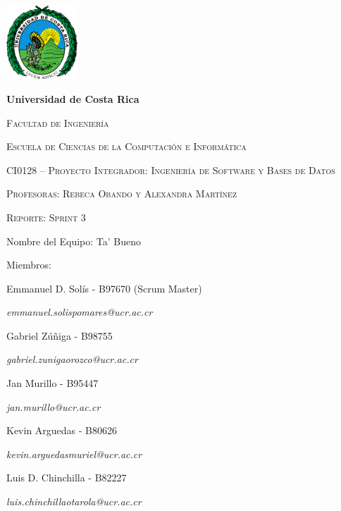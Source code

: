 \documentclass{article}
\begin{document}
\begin{titlepage}
\centering
{\includegraphics[width=0.2\textwidth]{logoUCR.png}\par}
\vspace{1cm}
{\bfseries\LARGE Universidad de Costa Rica \par}
\vspace{1cm}
{\scshape\Large Facultad de Ingenier\'ia \par}
{\scshape\Large Escuela de Ciencias de la Computaci\'on e Inform\'atica \par}
\vspace{1cm}
{\scshape\Large CI0128 – Proyecto Integrador: Ingeniería de Software y Bases de Datos \par}
{\scshape\Large Profesoras: Rebeca Obando y Alexandra Martínez \par}
\vspace{1cm}
{\scshape\Huge Reporte: Sprint 3 \par}
\vspace{1cm}
{\Large Nombre del Equipo: Ta' Bueno \par}
\vspace{0.5cm}
{\Large Miembros: \par}
{\Large Emmanuel D. Sol\'is - B97670 (Scrum Master)\par}
{\Large \textit{\color{blue}emmanuel.solispomares@ucr.ac.cr} \par}
{\Large Gabriel Zúñiga - B98755\par}
{\Large \textit{\color{blue}gabriel.zunigaorozco@ucr.ac.cr} \par}
{\Large Jan Murillo - B95447\par}
{\Large \textit{\color{blue}jan.murillo@ucr.ac.cr} \par}
{\Large Kevin Arguedas - B80626\par}
{\Large \textit{\color{blue}kevin.arguedasmuriel@ucr.ac.cr} \par}
{\Large Luis D. Chinchilla - B82227\par}
{\Large \textit{\color{blue}luis.chinchillaotarola@ucr.ac.cr} \par}
\end{titlepage}

\newpage
\tableofcontents
\end{document}
